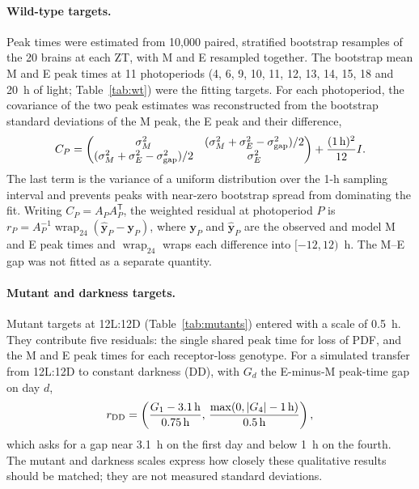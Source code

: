 \documentclass[10pt,a4paper]{article}
\newcommand{\fold}{\operatorname{wrap}_{24}}
\begin{document}
\paragraph{Wild-type targets.}
Peak times were estimated from 10,000 paired, stratified bootstrap
resamples of the 20 brains at each ZT, with M and E resampled together.
The bootstrap mean M and E peak times at 11 photoperiods (4, 6, 9, 10,
11, 12, 13, 14, 15, 18 and 20~h of light; Table~\ref{tab:wt}) were the
fitting targets. For each photoperiod, the covariance of the two peak
estimates was reconstructed from the bootstrap standard deviations of the
M peak, the E peak and their difference,
\begin{equation}
 C_P=
 \begin{pmatrix}
 \sigma_M^2 & (\sigma_M^2+\sigma_E^2-\sigma_{\rm gap}^2)/2\\
 (\sigma_M^2+\sigma_E^2-\sigma_{\rm gap}^2)/2 & \sigma_E^2
 \end{pmatrix}
 +\frac{(1\,\mathrm{h})^2}{12}I.
\end{equation}
The last term is the variance of a uniform distribution over the 1-h
sampling interval and prevents peaks with near-zero bootstrap spread from
dominating the fit. Writing $C_P=A_PA_P^{\mathsf T}$, the weighted
residual at photoperiod $P$ is
$r_P=A_P^{-1}\fold(\widehat{\mathbf y}_P-\mathbf y_P)$, where
$\mathbf y_P$ and $\widehat{\mathbf y}_P$ are the observed and model
M and E peak times and $\fold$ wraps each difference into
$[-12,12)$~h. The M--E gap was not fitted as a separate quantity.

\paragraph{Mutant and darkness targets.}
Mutant targets at 12L:12D (Table~\ref{tab:mutants}) entered with a scale
of 0.5~h. They contribute five residuals: the single shared peak time
for loss of PDF, and the M and E peak times for each receptor-loss
genotype. For a simulated transfer from 12L:12D to constant darkness
(DD), with $G_d$ the E-minus-M peak-time gap on day $d$,
\begin{equation}
 r_{\rm DD}=
 \left(
 \frac{G_1-3.1\,\mathrm{h}}{0.75\,\mathrm{h}},\,
 \frac{\max(0,|G_4|-1\,\mathrm{h})}{0.5\,\mathrm{h}}
 \right),
\end{equation}
which asks for a gap near 3.1~h on the first day and below 1~h on the
fourth. The mutant and darkness scales express how closely these
qualitative results should be matched; they are not measured standard
deviations.
\end{document}
